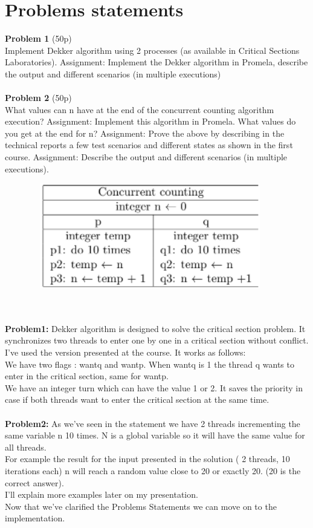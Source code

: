\documentclass[14pt]{article}
\begin{document}
\section*{Problems statements}
\vspace{20 mm}
\textbf{Problem 1} (50p) \\
Implement Dekker algorithm using 2 processes (as available
in Critical Sections Laboratories).
Assignment: Implement the Dekker algorithm in Promela, describe the output
and different scenarios (in multiple executions)
\\\vspace{10 mm}\\
\textbf{Problem 2} (50p) \\
What values can n have at the end of the concurrent counting algorithm execution?
Assignment: Implement this algorithm in Promela. What values do you get at the end for n?
Assignment: Prove the above by describing in the technical reports a few test
scenarios and different states as shown in the first course.
Assignment: Describe the output and different scenarios (in multiple executions).
\begin{center}
\includegraphics[height=1.8in, width = 5in]{problema2.png}\\
\end{center}
\newpage
\\\vspace{10 mm}\\
\textbf{Problem1:} Dekker algorithm is designed to solve the critical section problem. It synchronizes two threads to enter one by one in a critical section without conflict. I've used the version presented at the course. It works as follows:\\
We have two flags : wantq and wantp. When wantq is 1 the thread q wants to enter in the critical section, same for wantp.\\
We have an integer turn which can have the value 1 or 2. It saves the priority in case if both threads want to enter the critical section at the same time.
\\\vspace{20 mm}\\
\textbf{Problem2:} As we've seen in the statement we have 2 threads incrementing the same variable n 10 times. N is a global variable so it will have the same value for all threads.\\
For example the result for the input presented in the solution ( 2 threads, 10 iterations each) n will reach a random value close to 20 or exactly 20. (20 is the correct answer).\\
I'll explain more examples later on my presentation.\\
Now that we've clarified the Problems Statements we can move on to the implementation.
\newpage
\end{document}
